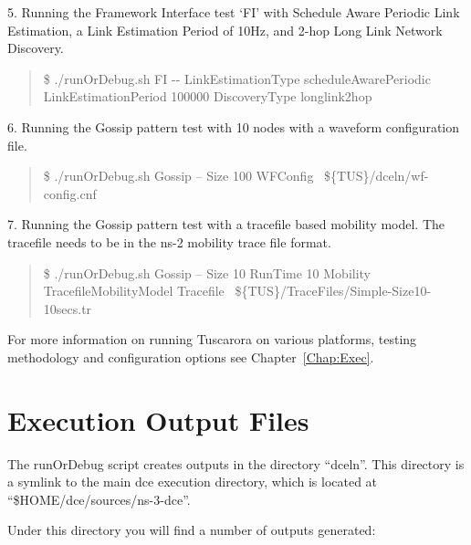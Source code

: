 5. Running the Framework Interface test `FI' with Schedule Aware
Periodic Link Estimation, a Link Estimation Period of 10Hz, and
2-hop Long Link Network Discovery.

\begin{quote}
\$ ./runOrDebug.sh FI -\mbox{}- LinkEstimationType
scheduleAwarePeriodic LinkEstimationPeriod 100000 DiscoveryType longlink2hop
\end{quote}
	

6. Running the Gossip pattern test with 10 nodes with a waveform configuration file.

\begin{quote}
	\$ ./runOrDebug.sh Gossip -- Size 100 WFConfig ~\$\{TUS\}/dceln/wf-config.cnf  \\
\end{quote}

7. Running the Gossip pattern test with a tracefile based mobility model. The tracefile needs to be in the ns-2 mobility trace file format.

\begin{quote}
	\$ ./runOrDebug.sh Gossip -- Size 10 RunTime 10 Mobility TracefileMobilityModel Tracefile ~\$\{TUS\}/TraceFiles/Simple-Size10-10secs.tr  \\
\end{quote}


For more information on running Tuscarora on various platforms, testing methodology and configuration options see Chapter~\ref{Chap:Exec}.

\section{Execution Output Files}

The runOrDebug script creates outputs in the directory ``dceln''. This directory is a symlink to the main dce execution directory, which is located at ``\$HOME/dce/sources/ns-3-dce''. 

Under this directory you will find a number of outputs generated:


